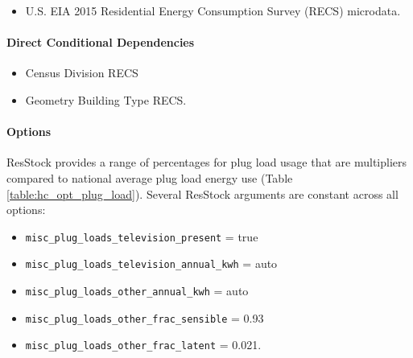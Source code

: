 \begin{itemize}
 
\item
  U.S. EIA 2015 Residential Energy Consumption Survey (RECS) microdata.
\end{itemize}

\paragraph{Direct Conditional Dependencies}
\begin{itemize}
    \item Census Division RECS
    \item Geometry Building Type RECS.
\end{itemize}

\paragraph{Options}

ResStock provides a range of percentages for plug load usage that are multipliers compared to national average plug load energy use (Table \ref{table:hc_opt_plug_load}). Several ResStock arguments are constant across all options:
\begin{itemize}
    \item \texttt{misc\_plug\_loads\_television\_present} = true
    \item \texttt{misc\_plug\_loads\_television\_annual\_kwh} = auto
    \item \texttt{misc\_plug\_loads\_other\_annual\_kwh} = auto
    \item \texttt{misc\_plug\_loads\_other\_frac\_sensible} = 0.93
    \item \texttt{misc\_plug\_loads\_other\_frac\_latent} = 0.021.
\end{itemize}

